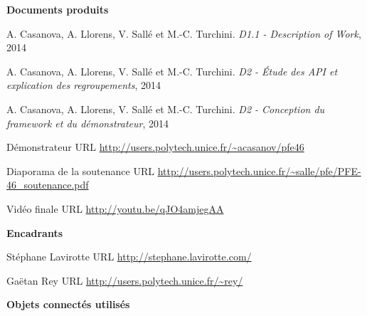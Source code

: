 \documentclass[nocopyrightspace]{sigplanconf}
\begin{document}

%

\newpage

\begin{thebibliography}{10}
\softraggedright

\item[]\hspace{-\labelwidth}\hspace{-\labelsep}\textbf{Documents produits}

A. Casanova, A. Llorens, V. Sallé et M.-C. Turchini.
\newblock \emph{D1.1 - Description of Work},
2014

A. Casanova, A. Llorens, V. Sallé et M.-C. Turchini.
\newblock \emph{D2 - Étude des API et explication des regroupements},
2014

A. Casanova, A. Llorens, V. Sallé et M.-C. Turchini.
\newblock \emph{D2 - Conception du framework et du démonstrateur},
2014

Démonstrateur
\newblock URL \url{http://users.polytech.unice.fr/~acasanov/pfe46}

Diaporama de la soutenance
\newblock URL \url{http://users.polytech.unice.fr/~salle/pfe/PFE-46_soutenance.pdf}

Vidéo finale
\newblock URL \url{http://youtu.be/qJO4amjegAA}

\item[]\hspace{-\labelwidth}\hspace{-\labelsep}\textbf{Encadrants}

Stéphane Lavirotte
\newblock URL \url{http://stephane.lavirotte.com/}

Gaëtan Rey
\newblock URL \url{http://users.polytech.unice.fr/~rey/}

\item[]\hspace{-\labelwidth}\hspace{-\labelsep}\textbf{Objets connectés utilisés}


\end{thebibliography}
\end{document}
